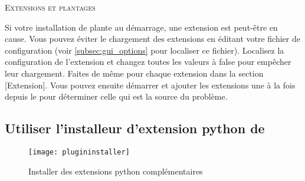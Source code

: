 \begin{Tip}\caption{\textsc{Extensions et plantages}}
Si votre installation de \qg plante au démarrage, une extension est peut-être en cause. Vous pouvez éviter le chargement des extensions en éditant votre fichier de configuration (voir \ref{subsec:gui_options} pour localiser ce fichier). Localisez la configuration de l'extension et changez toutes les valeurs à false pour empêcher leur chargement.  Faites de même pour chaque extension dans la section [Extension]. Vous pouvez ensuite démarrer \qg et ajouter les extensions une à la fois depuis le  pour déterminer celle qui est la source du problème.
\end{Tip}

\subsection{Utiliser l'installeur d'extension python de \qg}\label{sec:python_plugin_installer}

\begin{figure}[ht]
   \begin{center}
   \texttt{[image: plugininstaller]}
   \caption{Installer des extensions python complémentaires\nixcaption}
\label{fig:plugininstaller}
\end{center}
\end{figure}

